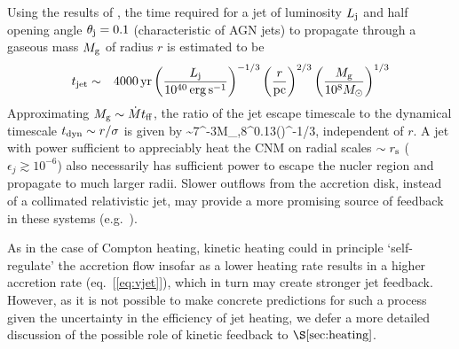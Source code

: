 \documentclass[usenatbib,fleqn]{mn2e}
\begin{document}
Using the results of \citet{Bromberg+11}, the time required for a jet of luminosity $L_{\rm
  j}$ and half opening angle $\theta_{\rm j} = 0.1$ (characteristic of
AGN jets) to propagate through a gaseous mass $M_{\rm g}$ of radius $r$ is estimated to be
\begin{eqnarray}
t_{\rm jet} &\sim& 4000\,{\rm yr}\left(\frac{{L}_{\rm j}}{10^{40}\,\rm erg\,s^{-1}}\right)^{-1/3}\left(\frac{r}{\rm pc}\right)^{2/3}\left(\frac{M_{\rm g}}{10^{8}M_{\odot}}\right)^{1/3} 
\end{eqnarray}
Approximating $M_{\rm g} \sim \dot{M}t_{\rm ff}$, the ratio of the jet escape timescale to the dynamical timescale $t_{\rm dyn} \sim r/\sigma$ is given by
\be
{} \sim 7^{-3}M_{\bullet,8}^{0.13}\left(\right)^{-1/3},
\ee
independent of $r$.  A jet with power sufficient to appreciably heat the CNM on radial scales $\sim r_{\rm s}$ ($\epsilon_{j} \gtrsim 10^{-6}$) also necessarily has sufficient power to escape the nucler region and propagate to much larger radii.  Slower outflows from the accretion disk, instead of a collimated relativistic jet, may provide a more promising source of feedback in these systems (e.g.~\citealt{Li+13}).    

As in the case of Compton heating, kinetic heating could in principle  `self-regulate' the accretion flow insofar as a lower heating rate results in a higher accretion rate (eq.~[\ref{eq:vjet}]), which in turn may create stronger jet feedback.  However, as it is not possible to make concrete predictions for such a process given the uncertainty in the efficiency of jet heating, we defer a more detailed discussion of the possible role of kinetic feedback to $\S\ref{sec:heating}$.
\end{document}
